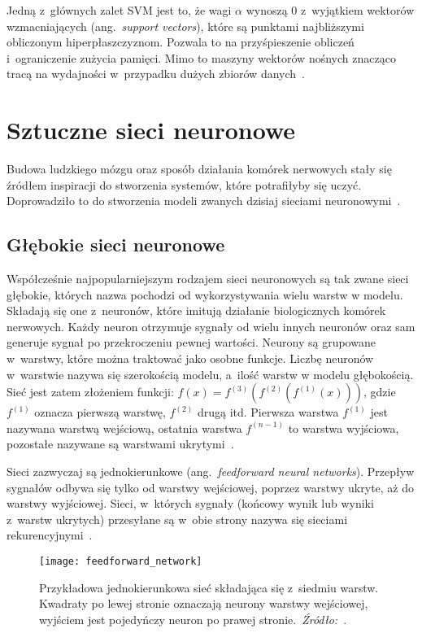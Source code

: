 Jedną z~głównych zalet SVM jest to, że wagi \(\alpha\) wynoszą 0 z~wyjątkiem wektorów wzmacniających (ang.~\textit{support vectors}), które są punktami najbliższymi obliczonym hiperpłaszczyznom.
Pozwala to na przyśpieszenie obliczeń i~ograniczenie zużycia pamięci.
Mimo to maszyny wektorów nośnych znacząco tracą na wydajności w~przypadku dużych zbiorów danych~\cite{Russell2020, Goodfellow2016}.

\section{Sztuczne sieci neuronowe}\label{sec:sztuczne-sieci-neuronowe}

Budowa ludzkiego mózgu oraz sposób działania komórek nerwowych stały się źródłem inspiracji do stworzenia systemów, które potrafiłyby się uczyć.
Doprowadziło to do stworzenia modeli zwanych dzisiaj sieciami neuronowymi~\cite{Russell2020}.

\subsection{Głębokie sieci neuronowe}\label{subsec:gebokie-sieci-neuronowe}

Współcześnie najpopularniejszym rodzajem sieci neuronowych są tak zwane sieci głębokie, których nazwa pochodzi od wykorzystywania wielu warstw w modelu.
Składają się one z~neuronów, które imitują działanie biologicznych komórek nerwowych.
Każdy neuron otrzymuje sygnały od wielu innych neuronów oraz sam generuje sygnał po przekroczeniu pewnej wartości.
Neurony są grupowane w~warstwy, które można traktować jako osobne funkcje.
Liczbę neuronów w~warstwie nazywa się szerokością modelu, a~ilość warstw w modelu głębokością.
Sieć jest zatem złożeniem funkcji: \(f(x) = f^{(3)}(f^{(2)}(f^{(1)}(x)))\), gdzie \(f^{(1)}\) oznacza pierwszą warstwę, \(f^{(2)}\) drugą itd.
Pierwsza warstwa \(f^{(1)}\) jest nazywana warstwą wejściową, ostatnia warstwa \(f^{(n - 1)}\) to warstwa wyjściowa, pozostałe nazywane są warstwami ukrytymi~\cite{Goodfellow2016}.

Sieci zazwyczaj są jednokierunkowe (ang.~\textit{feedforward neural networks}).
Przepływ sygnałów odbywa się tylko od warstwy wejściowej, poprzez warstwy ukryte, aż do warstwy wyjściowej.
Sieci, w~których sygnały (końcowy wynik lub wyniki z~warstw ukrytych) przesyłane są w~obie strony nazywa się sieciami rekurencyjnymi~\cite{Goodfellow2016}.

\begin{figure}[h]
    \centering
    \texttt{[image: feedforward\_network]}
    \caption{Przykładowa jednokierunkowa sieć składająca się z~siedmiu warstw. Kwadraty po lewej stronie oznaczają neurony warstwy wejściowej, wyjściem jest pojedyńczy neuron po prawej stronie.~\textit{Źródło:~\cite{Russell2020}}.}
    \label{fig:feedforward-network}
\end{figure}

